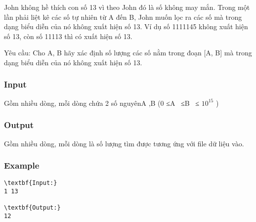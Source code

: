 



   John không hề thích con số 13 vì theo John đó là số không may mắn. Trong một lần phải liệt kê các số tự nhiên từ A đến B, John muốn lọc ra các số mà trong dạng biểu diễn của nó không xuất hiện số 13. Ví dụ số 1111145 không xuất hiện số 13, còn số 11113 thì có xuất hiện số 13.  

   Yêu cầu: Cho A, B hãy xác định số lượng các số nằm trong đoạn [A, B] mà trong dạng biểu diễn của nó không xuất hiện số 13.  

\subsubsection{   Input  }

   Gồm nhiều dòng, mỗi dòng chứa 2 số nguyênA ,B (0 ≤A  ≤B  ≤ $10^{15}$   )  

\subsubsection{   Output  }

   Gồm nhiều dòng, mỗi dòng là số lượng tìm được tương ứng với file dữ liệu vào.  

\subsubsection{   Example  }
\begin{verbatim}
\textbf{Input:}
1 13

\textbf{Output:}
12\end{verbatim}
